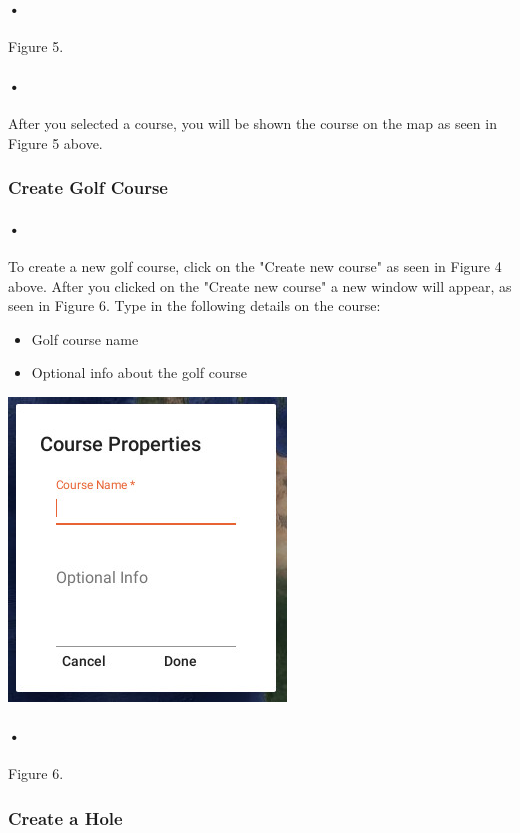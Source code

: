 \documentclass{article}
\begin{document}
	 \paragraph{•}
    Figure 5.  
	 
	 \paragraph{•}
	 After you selected a course, you will be shown the course on the map as seen in Figure 5 above.
    
    \subsubsection{Create Golf Course}
    \paragraph{•}
    To create a new golf course, click on the "Create new course" as seen in Figure 4 above. After you clicked on the "Create new course" a new window will appear, as seen in Figure 6. Type in the following details on the course:
    
    \begin{itemize}
    		\item Golf course name
    		\item Optional info about the golf course
    \end{itemize}
    
    \includegraphics[scale=1.5]{4_create_course_popup}
	\paragraph{•}
    Figure 6.
	
    
    \subsubsection{Create a Hole}
\end{document}
